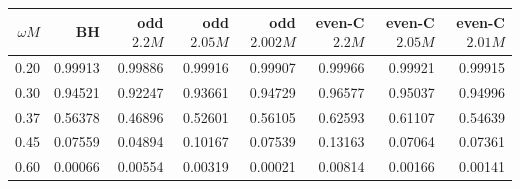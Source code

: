 \begin{tabular}{rrrrrrrr}\toprule
$\omega M$ & BH & odd $2.2M$ & odd $2.05M$ & odd $2.002M$ & even-C $2.2M$ & even-C $2.05M$ & even-C $2.01M$\\\midrule
0.20 & 0.99913 & 0.99886 & 0.99916 & 0.99907 & 0.99966 & 0.99921 & 0.99915\\
0.30 & 0.94521 & 0.92247 & 0.93661 & 0.94729 & 0.96577 & 0.95037 & 0.94996\\
0.37 & 0.56378 & 0.46896 & 0.52601 & 0.56105 & 0.62593 & 0.61107 & 0.54639\\
0.45 & 0.07559 & 0.04894 & 0.10167 & 0.07539 & 0.13163 & 0.07064 & 0.07361\\
0.60 & 0.00066 & 0.00554 & 0.00319 & 0.00021 & 0.00814 & 0.00166 & 0.00141\\
\bottomrule\end{tabular}

